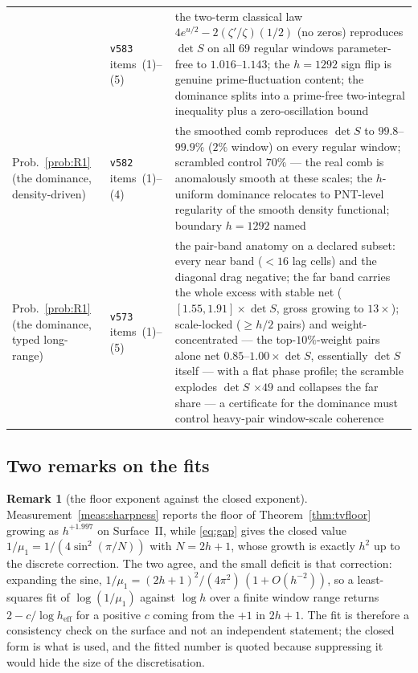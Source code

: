 \documentclass[11pt,a4paper]{article}
\theoremstyle{plain}
\theoremstyle{definition}
\newtheorem{remark}[theorem]{Remark}
\begin{document}
{\begin{xltabular}{\textwidth}{@{}llY@{}}
  & \texttt{v583} items~(1)--(5)
  & the two-term classical law $4e^{u/2}-2(\zeta'/\zeta)(1/2)$ (no
    zeros) reproduces $\det S$ on all $69$ regular windows
    parameter-free to $1.016$--$1.143$; the $h=1292$ sign flip is
    genuine prime-fluctuation content; the dominance splits into a
    prime-free two-integral inequality plus a zero-oscillation bound \\
Prob.~\ref{prob:R1} (the dominance, density-driven)
  & \texttt{v582} items~(1)--(4)
  & the smoothed comb reproduces $\det S$ to $99.8$--$99.9\%$ ($2\%$
    window) on every regular window; scrambled control $70\%$ --- the
    real comb is anomalously smooth at these scales; the $h$-uniform
    dominance relocates to PNT-level regularity of the smooth density
    functional; boundary $h=1292$ named \\
Prob.~\ref{prob:R1} (the dominance, typed long-range)
  & \texttt{v573} items~(1)--(5)
  & the pair-band anatomy on a declared subset: every near band
    ($<16$ lag cells) and the diagonal drag negative; the far band
    carries the whole excess with stable net ($[1.55,1.91]\times\det S$,
    gross growing to $13\times$); scale-locked ($\ge h/2$ pairs) and
    weight-concentrated --- the top-$10\%$-weight pairs alone net
    $0.85$--$1.00\times\det S$, essentially $\det S$ itself --- with a
    flat phase profile; the scramble explodes $\det S$
    $\times49$ and collapses the far share --- a certificate for the
    dominance must control heavy-pair window-scale coherence \\
\end{xltabular}}

\subsection{Two remarks on the fits}
\label{sec:fits}

\begin{remark}[the floor exponent against the closed exponent]
\label{rem:fit2}
Measurement~\ref{meas:sharpness} reports the floor of
Theorem~\ref{thm:tvfloor} growing as $h^{+1.997}$ on Surface~II, while
\eqref{eq:gap} gives the closed value $1/\mu_1=1/(4\sin^{2}(\pi/N))$ with
$N=2h+1$, whose growth is exactly $h^{2}$ up to the discrete correction. The
two agree, and the small deficit is that correction: expanding the sine,
$1/\mu_1=(2h+1)^{2}/(4\pi^{2})\,(1+O(h^{-2}))$, so a least-squares fit of
$\log(1/\mu_1)$ against $\log h$ over a finite window range returns
$2-c/\log h_{\mathrm{eff}}$ for a positive $c$ coming from the $+1$ in $2h+1$.
The fit is therefore a consistency check on the surface and not an independent
statement; the closed form is what is used, and the fitted number is quoted
because suppressing it would hide the size of the discretisation.
\end{remark}
\end{document}
